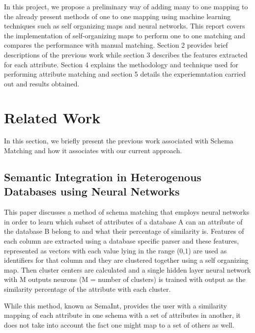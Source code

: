 \documentclass[conference]{IEEEtran}
\begin{document}
In this project, we propose a preliminary way of adding many to one mapping to the already present methods of one to one mapping using machine learning techniques such as self organizing maps and neural networks. This report covers the implementation of self-organizing maps to perform one to one matching and compares the performance with manual matching. Section 2 provides brief descriptions of the previous work while section 3 describes the features extracted for each attribute. Section 4 explains the methodology and technique used for performing attribute matching and section 5 details the experiemntation carried out and results obtained.


\section{Related Work}
In this section, we briefly present the previous work associated with Schema Matching and how it associates with our current approach.
\subsection{\textbf{Semantic Integration in Heterogenous Databases using Neural Networks}}
This paper discusses a method of schema matching that employs neural networks in order to learn which subset of attributes of a database A can an attribute of the database B belong to and what their percentage of similarity is. Features of each column are extracted using a database specific parser and these features, represented as vectors with each value lying in the range (0,1) are used as identifiers for that column and they are clustered together using a self organizing map. Then cluster centers are calculated and a single hidden layer neural network with M outputs neurons (M = number of clusters) is trained with output as the similarity percentage of the attribute with each cluster.

While this method, known as SemaInt, provides the user with a similarity mapping of each attribute in one schema with a set of attributes in another, it does not take into account the fact one might map to a set of others as well.
\end{document}
